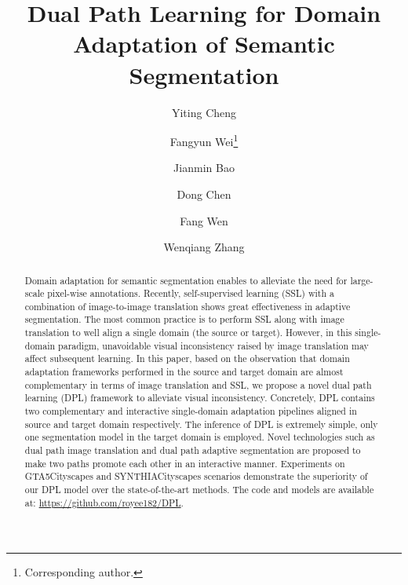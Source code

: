 \documentclass[10pt,twocolumn,letterpaper]{article}
\newcommand*\samethanks[1][\value{footnote}]{\footnotemark[#1]}
\begin{document}
\title{Dual Path Learning for Domain Adaptation of Semantic Segmentation\vspace{-0.5cm}}
\author[1]{Yiting Cheng}
\author[2]{\hspace{0.3cm}Fangyun Wei\thanks{Corresponding author.}}
\author[2]{\hspace{0.3cm}Jianmin Bao}
\author[2]{\hspace{0.3cm}Dong Chen}
\author[2]{\hspace{0.3cm}Fang Wen}
\author[1]{\hspace{0.3cm}Wenqiang Zhang\samethanks[1]\vspace{-0.3cm}}
\maketitle

\begin{abstract}
 Domain adaptation for semantic segmentation enables to alleviate the need for large-scale pixel-wise annotations. Recently, self-supervised learning (SSL) with a combination of image-to-image translation shows great effectiveness in adaptive segmentation. The most common practice is to perform SSL along with image translation to well align a single domain (the source or target). However, in this single-domain paradigm, unavoidable visual inconsistency raised by image translation may affect subsequent learning. In this paper, based on the observation that domain adaptation frameworks performed in the source and target domain are almost complementary in terms of image translation and SSL, we propose a novel dual path learning (DPL) framework to alleviate visual inconsistency. Concretely, DPL contains two complementary and interactive single-domain adaptation pipelines aligned in source and target domain respectively. The inference of DPL is extremely simple, only one segmentation model in the target domain is employed. Novel technologies such as dual path image translation and dual path adaptive segmentation are proposed to make two paths promote each other in an interactive manner. Experiments on GTA5Cityscapes and SYNTHIACityscapes scenarios demonstrate the superiority of our DPL model over the state-of-the-art methods. The code and models are available at: \url{https://github.com/royee182/DPL}.
\end{abstract}
\end{document}
